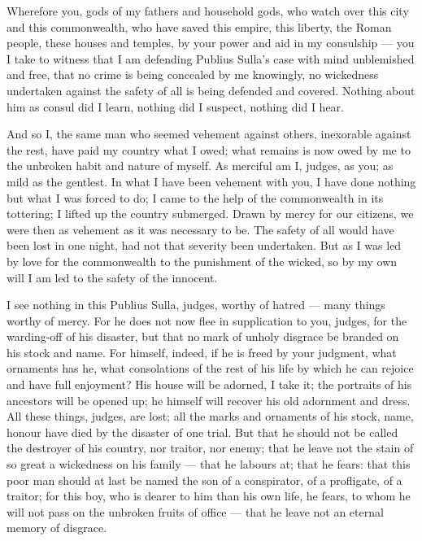  Wherefore you, gods of my fathers and household gods, who watch over this city and this commonwealth, who have saved this empire, this liberty, the Roman people, these houses and temples, by your power and aid in my consulship --- you I take to witness that I am defending Publius Sulla's case with mind unblemished and free, that no crime is being concealed by me knowingly, no wickedness undertaken against the safety of all is being defended and covered. Nothing about him as consul did I learn, nothing did I suspect, nothing did I hear.

 And so I, the same man who seemed vehement against others, inexorable against the rest, have paid my country what I owed; what remains is now owed by me to the unbroken habit and nature of myself. As merciful am I, judges, as you; as mild as the gentlest. In what I have been vehement with you, I have done nothing but what I was forced to do; I came to the help of the commonwealth in its tottering; I lifted up the country submerged. Drawn by mercy for our citizens, we were then as vehement as it was necessary to be. The safety of all would have been lost in one night, had not that severity been undertaken. But as I was led by love for the commonwealth to the punishment of the wicked, so by my own will I am led to the safety of the innocent.

 I see nothing in this Publius Sulla, judges, worthy of hatred --- many things worthy of mercy. For he does not now flee in supplication to you, judges, for the warding-off of his disaster, but that no mark of unholy disgrace be branded on his stock and name. For himself, indeed, if he is freed by your judgment, what ornaments has he, what consolations of the rest of his life by which he can rejoice and have full enjoyment? His house will be adorned, I take it; the portraits of his ancestors will be opened up; he himself will recover his old adornment and dress. All these things, judges, are lost; all the marks and ornaments of his stock, name, honour have died by the disaster of one trial. But that he should not be called the destroyer of his country, nor traitor, nor enemy; that he leave not the stain of so great a wickedness on his family --- that he labours at; that he fears: that this poor man should at last be named the son of a conspirator, of a profligate, of a traitor; for this boy, who is dearer to him than his own life, he fears, to whom he will not pass on the unbroken fruits of office --- that he leave not an eternal memory of disgrace.

